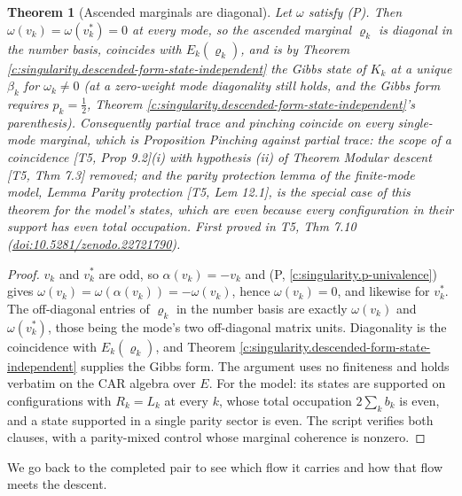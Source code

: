 \documentclass[11pt]{article}
\newtheorem{theorem}{Theorem}[section]
\theoremstyle{definition}
\theoremstyle{plain}
\begin{document}
\begin{theorem}[Ascended marginals are diagonal]\label{c:singularity.ascended-marginals-are-diagonal}
Let $\omega$ satisfy (P). Then $\omega(v_k) = \omega(v_k^{*}) = 0$ at every mode, so the ascended marginal $\varrho_k$ is diagonal in the number basis, coincides with $E_k(\varrho_k)$, and is by Theorem \ref{c:singularity.descended-form-state-independent} the Gibbs state of $K_k$ at a unique $\beta_k$ for $\omega_k \neq 0$ (at a zero-weight mode diagonality still holds, and the Gibbs form requires $p_k = \tfrac12$, Theorem \ref{c:singularity.descended-form-state-independent}'s parenthesis). Consequently partial trace and pinching coincide on every single-mode marginal, which is Proposition \emph{Pinching against partial trace: the scope of a coincidence} [T5, Prop 9.2](i) with hypothesis (ii) of Theorem \emph{Modular descent} [T5, Thm 7.3] removed; and the parity protection lemma of the finite-mode model, Lemma \emph{Parity protection} [T5, Lem 12.1], is the special case of this theorem for the model's states, which are even because every configuration in their support has even total occupation.
\emph{First proved in} T5, Thm 7.10 (\href{https://doi.org/10.5281/zenodo.22721790}{doi:10.5281/zenodo.22721790}).
\end{theorem}
\begin{proof}
$v_k$ and $v_k^{*}$ are odd, so $\alpha(v_k) = -v_k$ and (P, \ref{c:singularity.p-univalence}) gives $\omega(v_k) = \omega(\alpha(v_k)) = -\omega(v_k)$, hence $\omega(v_k) = 0$, and likewise for $v_k^{*}$. The off-diagonal entries of $\varrho_k$ in the number basis are exactly $\omega(v_k)$ and $\omega(v_k^{*})$, those being the mode's two off-diagonal matrix units. Diagonality is the coincidence with $E_k(\varrho_k)$, and Theorem \ref{c:singularity.descended-form-state-independent} supplies the Gibbs form. The argument uses no finiteness and holds verbatim on the CAR algebra over $E$. For the model: its states are supported on configurations with $R_k = L_k$ at every $k$, whose total occupation $2\sum_k b_k$ is even, and a state supported in a single parity sector is even. The script verifies both clauses, with a parity-mixed control whose marginal coherence is nonzero.

\end{proof}

We go back to the completed pair to see which flow it carries and how that flow meets the descent.
\end{document}
